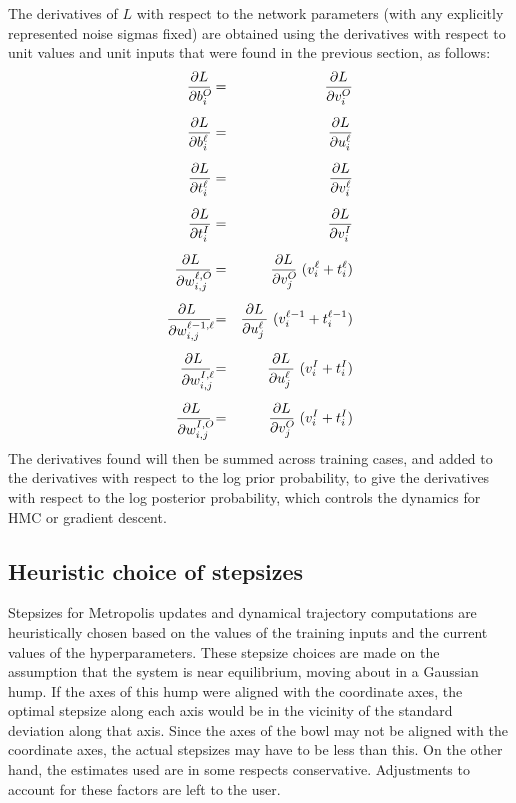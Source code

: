 \documentclass{report}[11pt]
\def\beq{\begin{eqnarray}}
\def\eeq{\end{eqnarray}}
\begin{document}
The derivatives of $L$ with respect to the network parameters (with
any explicitly represented noise sigmas fixed) are obtained using the
derivatives with respect to unit values and unit inputs that were found in 
the previous section, as follows:\beq
  {\partial L \over \partial b^O_{i\ }\!} & = & 
    {\partial L \over \partial v^O_i} \\[5pt]
  {\partial L \over \partial b^{\ell}_{i\ }\!} & = & 
    {\partial L \over \partial u^{\ell}_i} \\[5pt]
  {\partial L \over \partial t^{\ell}_{i\ }\!} & = & 
    {\partial L \over \partial v^{\ell}_i} \\[5pt]
  {\partial L \over \partial t^I_{i\ }\!} & = & 
    {\partial L \over \partial v^I_i} \\[5pt]
  {\partial L\ \over \partial w^{\ell,O}_{i,j}\!} & = &
    {\partial L \over \partial v^O_{j\ }\!}\ (v^{\ell}_i+t^{\ell}_i) \\[5pt]
  {\partial L\ \over \partial w^{\ell-1,\ell}_{i,j}\!\!} & = &
    {\partial L \over \partial u^{\ell}_{j\ }\!}\ (v^{\ell-1}_i+t^{\ell-1}_i)
    \\[5pt]
  {\partial L\ \over \partial w^{I,\ell}_{i,j}\!\!} & = &
    {\partial L \over \partial u^{\ell}_{j\ }\!}\ (v^I_i+t^I_i) \\[5pt]
  {\partial L\ \over \partial w^{I,O}_{i,j}\!\!} & = &
    {\partial L \over \partial v^O_{j\ }\!}\ (v^I_i+t^I_i) 
\eeq%
The derivatives found will then be summed across training cases, and 
added to the derivatives with respect to the log prior probability, to
give the derivatives with respect to the log posterior probability,
which controls the dynamics for HMC or gradient descent.


\subsection*{Heuristic choice of stepsizes}\label{app-sec-heuristic}

Stepsizes for Metropolis updates and dynamical trajectory computations
are heuristically chosen based on the values of the training inputs
and the current values of the hyperparameters.  These stepsize choices
are made on the assumption that the system is near equilibrium, moving
about in a Gaussian hump.  If the axes of this hump were aligned with
the coordinate axes, the optimal stepsize along each axis would be in
the vicinity of the standard deviation along that axis.  Since the
axes of the bowl may not be aligned with the coordinate axes, the
actual stepsizes may have to be less than this.  On the other hand,
the estimates used are in some respects conservative.  Adjustments to
account for these factors are left to the user.
\end{document}
